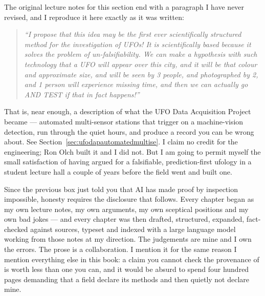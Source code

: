\begin{funfact}
The original lecture notes for this section end with a paragraph I have never revised, and I
reproduce it here exactly as it was written:

\begin{quote}\itshape\small
``I propose that this idea may be the first ever scientifically structured method for the
investigation of UFOs! It is scientifically based because it solves the problem of
un-falsifiability. We can make a hypothesis with such technology that a UFO will appear over
this city, and it will be that colour and approximate size, and will be seen by 3 people, and
photographed by 2, and 1 person will experience missing time, and then we can actually go AND
TEST if that in fact happens!''
\end{quote}

\noindent That is, near enough, a description of what the UFO Data Acquisition Project became
--- automated multi-sensor stations that trigger on a machine-vision detection, run through
the quiet hours, and produce a record you can be wrong about. See
Section~\ref{sec:ufodapautomatedmultise}. I claim no credit for the engineering; Ron Olch
built it and I did not. But I am going to permit myself the small satisfaction of having
argued for a falsifiable, prediction-first ufology in a student lecture hall a couple of
years before the field went and built one.
\end{funfact}

\begin{funfact}
Since the previous box just told you that AI has made proof by inspection impossible, honesty
requires the disclosure that follows. 
Every chapter began as my own lecture notes, my own arguments, my own sceptical positions and
my own bad jokes --- and every chapter was then drafted, structured, expanded, fact-checked
against sources, typeset and indexed with a large language model working from those notes at
my direction. The judgements are mine and I own the errors. The prose is a collaboration.
I mention it for the same reason I mention everything else in this book: a claim you cannot
check the provenance of is worth less than one you can, and it would be absurd to spend four
hundred pages demanding that a field declare its methods and then quietly not declare mine.
\end{funfact}

